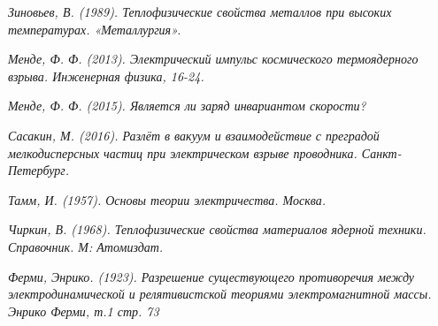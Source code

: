 \documentclass[12pt]{article}
\begin{document}
\begin{thebibliography}{99}
\textit{Зиновьев, В. (1989). Теплофизические свойства металлов при высоких температурах. «Металлургия».}

\textit{Менде, Ф. Ф. (2013). Электрический импульс космического термоядерного взрыва. Инженерная физика, 16-24.}

\textit{Менде, Ф. Ф. (2015). Является ли заряд инвариантом скорости?}%

\textit{Сасакин, М. (2016). Разлёт в вакуум и взаимодействие с преградой мелкодисперсных частиц при электрическом взрыве проводника. Санкт-Петербург.}

\textit{Тамм, И. (1957). Основы теории электричества. Москва.}

\textit{Чиркин, В. (1968). Теплофизические свойства материалов ядерной техники. Справочник. М: Атомиздат.}

\textit{Ферми, Энрико. (1923). Разрешение существующего противоречия между электродинамической и релятивистской теориями электромагнитной массы. Энрико Ферми, т.1 стр. 73}



\end{thebibliography}
\end{document}
